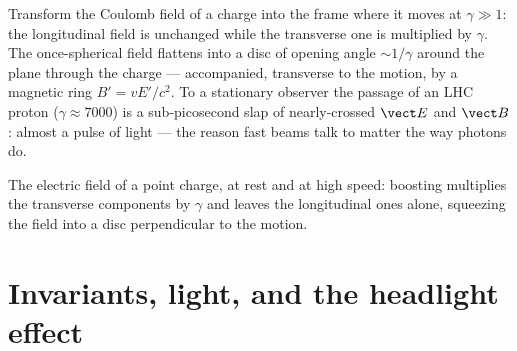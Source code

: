 \begin{example}\label{ex:b3:covariant-electromagnetism:pancake}
Transform the Coulomb field of a charge into the frame where it moves
at $\gamma \gg 1$: the longitudinal field is unchanged while the
transverse one is multiplied by $\gamma$. The once-spherical field
flattens into a disc of opening angle $\sim 1/\gamma$ around the
plane through the charge --- accompanied, transverse to the motion,
by a magnetic ring $B' = vE'/c^2$. To a stationary observer the
passage of an LHC proton ($\gamma \approx 7000$) is a
sub-picosecond slap of nearly-crossed $\vect E$ and $\vect B$: almost
a pulse of light --- the reason fast beams talk to matter the way
photons do.
\end{example}

\begin{omfigure}

{\small The electric field of a point charge, at rest and at high
speed: boosting multiplies the transverse components by $\gamma$ and
leaves the longitudinal ones alone, squeezing the field into a disc
perpendicular to the motion.}
\end{omfigure}

\section{Invariants, light, and the headlight effect}


